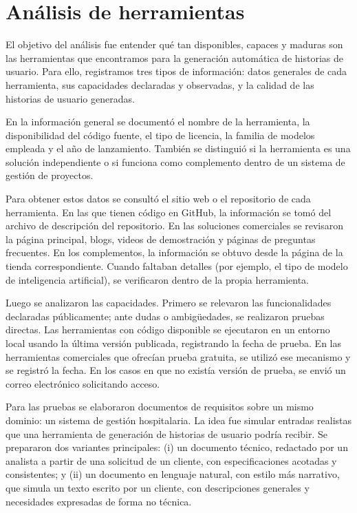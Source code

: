 \section{Análisis de herramientas}

El objetivo del análisis fue entender qué tan disponibles, capaces y maduras son las herramientas que encontramos para la generación automática de historias de usuario. Para ello, registramos tres tipos de información: datos generales de cada herramienta, sus capacidades declaradas y observadas, y la calidad de las historias de usuario generadas.

En la información general se documentó el nombre de la herramienta, la disponibilidad del código fuente, el tipo de licencia, la familia de modelos empleada y el año de lanzamiento. También se distinguió si la herramienta es una solución independiente o si funciona como complemento dentro de un sistema de gestión de proyectos.

Para obtener estos datos se consultó el sitio web o el repositorio de cada herramienta. En las que tienen código en GitHub, la información se tomó del archivo de descripción del repositorio. En las soluciones comerciales se revisaron la página principal, blogs, videos de demostración y páginas de preguntas frecuentes. En los complementos, la información se obtuvo desde la página de la tienda correspondiente. Cuando faltaban detalles (por ejemplo, el tipo de modelo de inteligencia artificial), se verificaron dentro de la propia herramienta.

Luego se analizaron las capacidades. Primero se relevaron las funcionalidades declaradas públicamente; ante dudas o ambigüedades, se realizaron pruebas directas. Las herramientas con código disponible se ejecutaron en un entorno local usando la última versión publicada, registrando la fecha de prueba. En las herramientas comerciales que ofrecían prueba gratuita, se utilizó ese mecanismo y se registró la fecha. En los casos en que no existía versión de prueba, se envió un correo electrónico solicitando acceso.

Para las pruebas se elaboraron documentos de requisitos sobre un mismo dominio: un sistema de gestión hospitalaria. La idea fue simular entradas realistas que una herramienta de generación de historias de usuario podría recibir. Se prepararon dos variantes principales: (i) un documento técnico, redactado por un analista a partir de una solicitud de un cliente, con especificaciones acotadas y consistentes; y (ii) un documento en lenguaje natural, con estilo más narrativo, que simula un texto escrito por un cliente, con descripciones generales y necesidades expresadas de forma no técnica.

